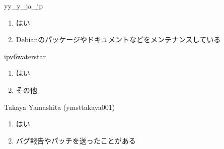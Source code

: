 \begin{prework}{ yy\_y\_ja\_jp }
  \begin{enumerate}
  \item はい
  \item Debianのパッケージやドキュメントなどをメンテナンスしている
  \end{enumerate}
\end{prework}

\begin{prework}{ ipv6waterstar }
  \begin{enumerate}
  \item はい
  \item その他
  \end{enumerate}
\end{prework}

\begin{prework}{ Takaya Yamashita (ymsttakaya001) }
  \begin{enumerate}
  \item はい
  \item バグ報告やパッチを送ったことがある
  \end{enumerate}
\end{prework}
